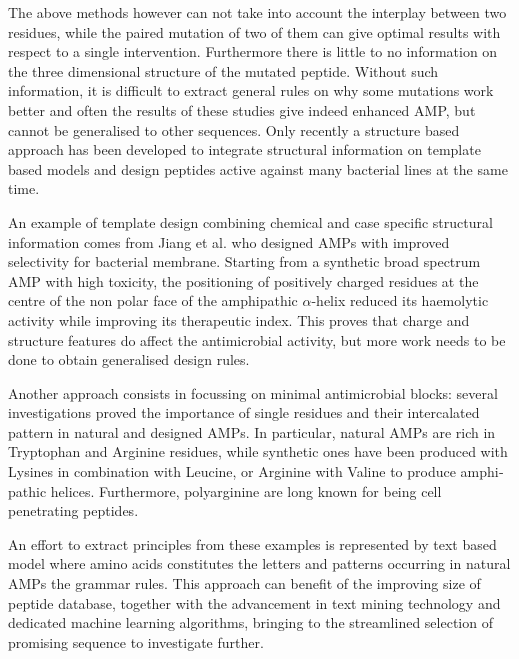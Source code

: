 \documentclass[a4paper,11pt]{extreport}
\begin{document}
The above methods however can not take into account the interplay between two residues, while the paired mutation of two of them can give optimal results with respect to a single intervention. Furthermore
there is little to no information on the three dimensional structure of the mutated peptide. Without such information, it is difficult to extract general rules on why some mutations work better and often the results of these studies give indeed enhanced AMP, but cannot be generalised to other sequences.
%
Only recently a structure based approach has been developed to integrate structural information on template based models and design peptides active against many bacterial lines at the same time.\cite{s41598-018-29566-5}

An example of template design combining chemical and case specific structural information comes from Jiang et al.\cite{Jiang??} who designed AMPs with improved selectivity for bacterial membrane. Starting from a synthetic broad spectrum AMP with high toxicity, the positioning of positively charged residues at the centre of the non ­polar face of the amphipathic $\alpha$-helix reduced its haemolytic activity while improving its therapeutic index.
This proves that charge and structure features do affect the antimicrobial activity, but more work needs to be done to obtain generalised design rules.

Another approach consists in focussing on minimal antimicrobial blocks: several investigations proved the importance of single residues and their intercalated pattern in natural and designed AMPs. In particular, natural AMPs are rich in Tryptophan and Arginine residues,\cite{Vogel???} while synthetic ones have been produced with Lysines in combination with Leucine, or Arginine with Valine to produce amphi­pathic helices.\cite{Deslouches}
Furthermore, polyarginine are long known for being cell penetrating peptides.\cite{doi.org/10.1016/j.febslet.2009.11.046}

An effort to extract principles from these examples is represented by text based model where amino acids constitutes the letters and patterns occurring in natural AMPs the grammar rules.\cite{Loose2006}
This approach can benefit of the improving size of peptide database, together with the advancement in text mining technology and dedicated machine learning algorithms, bringing to the streamlined selection of promising sequence to investigate further.\cite{IBMhttps://doi.org/10.1063/1.5027261}
\end{document}
